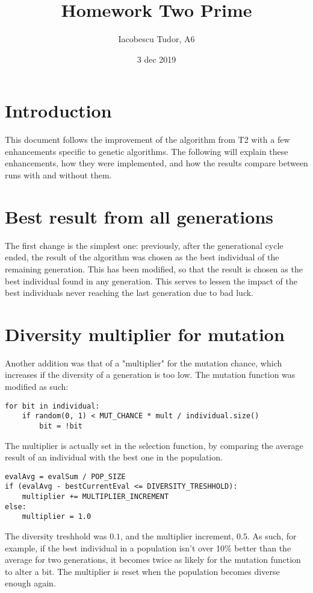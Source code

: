\documentclass{article}
\title{Homework Two Prime}
\date{3 dec 2019}
\author{Iacobescu Tudor, A6}
\begin{document}
	\maketitle
	
    \section{Introduction}
    This document follows the improvement of the algorithm from T2 with a few enhancements specific to genetic algorithms. The following will explain these enhancements, how they were implemented, and how the results compare between runs with and without them.

    \section{Best result from all generations}
    The first change is the simplest one: previously, after the generational cycle ended, the result of the algorithm was chosen as the best individual of the remaining generation. This has been modified, so that the result is chosen as the best individual found in any generation. This serves to lessen the impact of the best individuals never reaching the last generation due to bad luck.

    \section{Diversity multiplier for mutation}
    Another addition was that of a "multiplier" for the mutation chance, which increases if the diversity of a generation is too low.
    The mutation function was modified as such:

    \begin{verbatim}
for bit in individual:
    if random(0, 1) < MUT_CHANCE * mult / individual.size()
        bit = !bit
    \end{verbatim}

    The multiplier is actually set in the selection function, by comparing the average result of an individual with the best one in the population.

    \begin{verbatim}
evalAvg = evalSum / POP_SIZE
if (evalAvg - bestCurrentEval <= DIVERSITY_TRESHHOLD):
    multiplier += MULTIPLIER_INCREMENT
else:
    multiplier = 1.0
    \end{verbatim}

    The diversity treshhold was $0.1$, and the multiplier increment, $0.5$. As such, for example, if the best individual in a population isn't over 10\% better than the average for two generations, it becomes twice as likely for the mutation function to alter a bit. The multiplier is reset when the population becomes diverse enough again.
\end{document}

